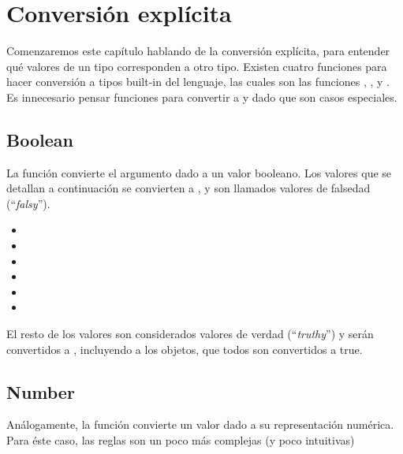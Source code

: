 \section{Conversión explícita}
\label{sec:conversionexplicita}

Comenzaremos este capítulo hablando de la conversión explícita, para entender qué valores de un tipo corresponden a otro tipo. Existen cuatro funciones para hacer conversión a tipos built-in del lenguaje, las cuales son las funciones , ,  y . Es innecesario pensar funciones para convertir a  y  dado que son casos especiales. 

\subsection{Boolean} 

La función  convierte el argumento dado a un valor booleano. Los valores que se detallan a continuación se convierten a , y son llamados valores de falsedad ("`\textit{falsy}"').

\begin{itemize}
\item {}
\item {}
\item {}
\item {}
\item {}
\item {}
\end{itemize}

El resto de los valores son considerados valores de verdad ("`\textit{truthy}"') y serán convertidos a , incluyendo a los objetos, que todos son convertidos a true.

\subsection{Number}

Análogamente, la función  convierte un valor dado a su representación numérica. Para éste caso, las reglas son un poco más complejas (y poco intuitivas)

